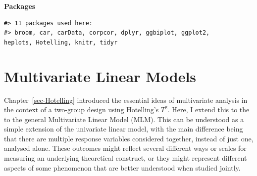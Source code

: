 \documentclass[
  letterpaper,
  10pt,
  krantz2]{krantz}
\begin{document}
\textbf{Packages}

\begin{verbatim}
#> 11 packages used here:
#> broom, car, carData, corpcor, dplyr, ggbiplot, ggplot2,
heplots, Hotelling, knitr, tidyr
\end{verbatim}


\chapter{Multivariate Linear Models}\label{sec-mlm-review}

\renewcommand*{\vec}[1]{\mathbf{#1}}
\newcommand{\trans}{^\mathsf{T}}
\newcommand*{\mat}[1]{\mathbf{#1}}
\newcommand*{\diag}[1]{\mathrm{diag}\, #1}

\renewcommand*{\det}[1]{\mathrm{det}(#1)}
\newcommand*{\rank}[1]{\mathrm{rank} (\mathbf{#1})}
\newcommand*{\trace}[1]{\mathrm{tr} (\mathbf{#1})}
\newcommand*{\dev}[1]{(#1 - \bar{#1})}
\newcommand*{\inv}[1]{\mat{#1}^{-1}}
\newcommand*{\half}[1]{\mat{#1}^{1/2}}
\newcommand*{\invhalf}[1]{\mat{#1}^{-1/2}}
\newcommand*{\nvec}[2]{{#1}_{1}, {#1}_{2},\ldots,{#1}_{#2}}
\newcommand*{\Beta}{\boldsymbol{B}}
\newcommand*{\Epsilon}{\boldsymbol{\Large\varepsilon}}
\newcommand*{\period}{\:\: .}
\newcommand*{\comma}{\:\: ,}
\newcommand*{\given}{\, | \,}
\newcommand*{\Real}[1]{\mathbb{R}^{#1}}
\newcommand*{\degree}[1]{{#1}^{\circ}}

\newcommand{\sizedmat}[2]{\mathord{\mathop{\mat{#1}}\limits_{#2}}}

\renewcommand*{\H}{\mathbf{H}}               
\newcommand*{\E}{\mathbf{E}}
\newcommand*{\widebar}[1]{\overline{#1}}

\newcommand{\Var}{\mathsf{Var}}
\newcommand{\Cov}{\mathsf{Cov}}
\newcommand{\HO}{\mathcal{H}_0}

\newcommand*{\V}{\mathcal{V}}

\newcommand{\pkg}[1]{\textsf{#1}}
\newcommand{\Rpackage}[1]{\pkg{#1} package}

Chapter~\ref{sec-Hotelling} introduced the essential ideas of
multivariate analysis in the context of a two-group design using
Hotelling's \(T^2\). Here, I extend this to the to the general
Multivariate Linear Model (MLM). This can be understood as a simple
extension of the univariate linear model, with the main difference being
that there are multiple response variables considered together, instead
of just one, analysed alone. These outcomes might reflect several
different ways or scales for measuring an underlying theoretical
construct, or they might represent different aspects of some phenomenon
that are better understood when studied jointly.
\end{document}
